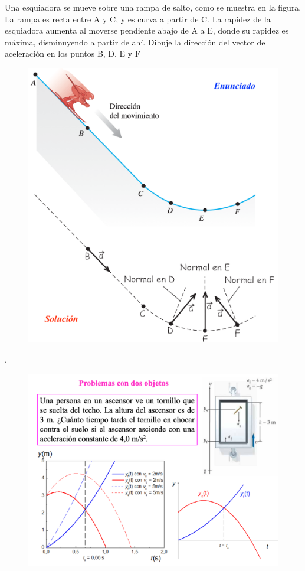\begin{prob}
Una esquiadora se mueve sobre una rampa de salto, como se muestra en la figura. La rampa es recta entre A y C, y es curva a partir de C. La rapidez de la esquiadora aumenta al moverse pendiente abajo de A a E, donde su rapidez es máxima, disminuyendo a partir de ahí. Dibuje la dirección del vector de aceleración en los puntos B, D, E y F	
\end{prob}
\begin{figure}[H]
		\centering
		\includegraphics[width=.6\textwidth]{imagenes/imagenes02/T02IM16.png}
		\end{figure}

\vspace{30mm} %

\begin{prob}.
	\begin{figure}[H]
		\centering
		\includegraphics[width=.9\textwidth]{imagenes/imagenes02/T02IM26.png}
		\end{figure}
\end{prob}

